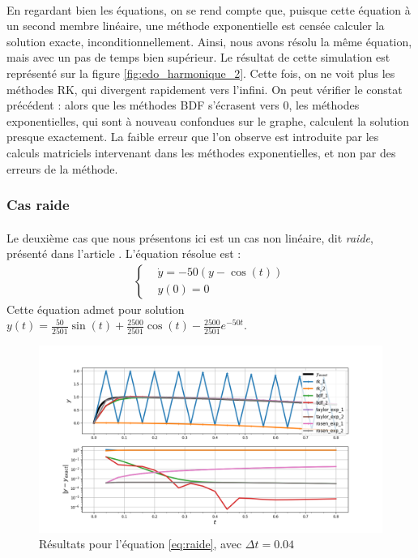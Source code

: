     \paragraph{}
    En regardant bien les équations, on se rend compte que, puisque cette équation à un second membre linéaire, une méthode exponentielle est censée calculer la solution exacte, inconditionnellement. Ainsi, nous avons résolu la même équation, mais avec un pas de temps bien supérieur. Le résultat de cette simulation est représenté sur la figure \ref{fig:edo_harmonique_2}. Cette fois, on ne voit plus les méthodes RK, qui divergent rapidement vers l'infini. On peut vérifier le constat précédent : alors que les méthodes BDF s'écrasent vers 0, les méthodes exponentielles, qui sont à nouveau confondues sur le graphe, calculent la solution presque exactement. La faible erreur que l'on observe est introduite par les calculs matriciels intervenant dans les méthodes exponentielles, et non par des erreurs de la méthode.


    \subsubsection{Cas raide}
    \paragraph{}
    Le deuxième cas que nous présentons ici est un cas non linéaire, dit \emph{raide}, présenté dans l'article \cite{stiff_equation}.
    L'équation résolue est :
    \begin{equation}
        \begin{split}
            \left\{
            \begin{aligned}
                &\dot{y} = -50\left(y - \cos\left(t\right)\right) \\
                &y\left(0\right) = 0
            \end{aligned}
            \right.
        \end{split}
    \label{eq:raide}
    \end{equation}
    Cette équation admet pour solution $y\left(t\right) = \frac{50}{2501}\sin\left(t\right)+\frac{2500}{2501}\cos\left(t\right) -\frac{2500}{2501}e^{-50t}$.
    \begin{figure}
        \centering
        \includegraphics[width=\textwidth]{images/results/edo_raide.png}
        \caption{Résultats pour l'équation \ref{eq:raide}, avec $\Delta t = 0.04$}
        \label{fig:edo_raide}
    \end{figure}
